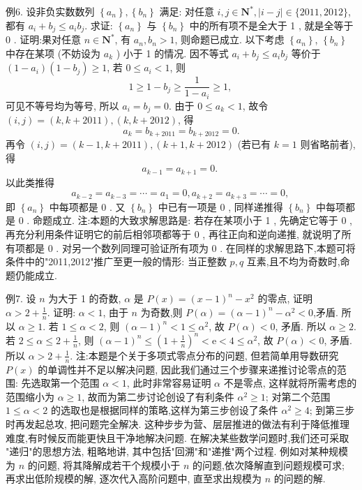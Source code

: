 例6. 设非负实数数列 $\left\{a_n\right\},\left\{b_n\right\}$ 满足: 对任意 $i, j \in \mathbf{N}^*,|i-j| \in \{2011,2012\}$, 都有 $a_i+b_j \leqslant a_i b_j$. 求证: $\left\{a_n\right\}$ 与 $\left\{b_n\right\}$ 中的所有项不是全大于 1 , 就是全等于 0 .
证明:果对任意 $n \in \mathbf{N}^*$, 有 $a_n, b_n>1$, 则命题已成立.
以下考虑 $\left\{a_n\right\}$, $\left\{b_n\right\}$ 中存在某项 (不妨设为 $a_k$ ) 小于 1 的情况.
因不等式 $a_i+b_j \leqslant a_i b_j$ 等价于 $\left(1-a_i\right)\left(1-b_j\right) \geqslant 1$, 若 $0 \leqslant a_i<1$, 则
$$
1 \geqslant 1-b_j \geqslant \frac{1}{1-a_i} \geqslant 1 \text {, }
$$
可见不等号均为等号, 所以 $a_i=b_j=0$.
由于 $0 \leqslant a_k<1$, 故令 $(i, j)=(k, k+2011),(k, k+2012)$, 得
$$
a_k=b_{k+2011}=b_{k+2012}=0 .
$$
再令 $(i, j)=(k-1, k+2011),(k+1, k+2012)$ (若已有 $k=1$ 则省略前者), 得
$$
a_{k-1}=a_{k+1}=0 \text {. }
$$
以此类推得
$$
a_{k-2}=a_{k-3}=\cdots=a_1=0, a_{k+2}=a_{k+3}=\cdots=0 \text {, }
$$
即 $\left\{a_n\right\}$ 中每项都是 0 . 又 $\left\{b_n\right\}$ 中已有一项是 0 , 同样递推得 $\left\{b_n\right\}$ 中每项都是 0 . 命题成立.
注:本题的大致求解思路是: 若存在某项小于 1 , 先确定它等于 0 , 再充分利用条件证明它的前后相邻项都等于 0 , 再往正向和逆向递推, 就说明了所有项都是 0 . 对另一个数列同理可验证所有项为 0 .
在同样的求解思路下,本题可将条件中的"2011,2012"推广至更一般的情形: 当正整数 $p, q$ 互素,且不均为奇数时,命题仍能成立.



例7. 设 $n$ 为大于 1 的奇数, $\alpha$ 是 $P(x)=(x-1)^n-x^2$ 的零点, 证明 $\alpha> 2+\frac{1}{n}$.
证明: $\alpha<1$, 由于 $n$ 为奇数,则 $P(\alpha)=(\alpha-1)^n-\alpha^2<0$,矛盾.
所以 $\alpha \geqslant 1$.
若 $1 \leqslant \alpha<2$, 则 $(\alpha-1)^n<1 \leqslant \alpha^2$, 故 $P(\alpha)<0$, 矛盾.
所以 $\alpha \geqslant 2$.
若 $2 \leqslant \alpha \leqslant 2+\frac{1}{n}$, 则 $(\alpha-1)^n \leqslant\left(1+\frac{1}{n}\right)^n<\mathrm{e}<4 \leqslant \alpha^2$, 故 $P(\alpha)<0$, 矛盾.
所以 $\alpha>2+\frac{1}{n}$.
注:本题是个关于多项式零点分布的问题, 但若简单用导数研究 $P(x)$ 的单调性并不足以解决问题, 因此我们通过三个步骤来递推讨论零点的范围: 先选取第一个范围 $\alpha<1$, 此时非常容易证明 $\alpha$ 不是零点, 这样就将所需考虑的范围缩小为 $\alpha \geqslant 1$, 故而为第二步讨论创设了有利条件 $\alpha^2 \geqslant 1$; 对第二个范围 $1 \leqslant \alpha<2$ 的选取也是根据同样的策略,这样为第三步创设了条件 $\alpha^2 \geqslant 4$; 到第三步时再发起总攻, 把问题完全解决.
这种步步为营、层层推进的做法有利于降低推理难度,有时候反而能更快且干净地解决问题.
在解决某些数学问题时,我们还可采取 "递归"的思想方法, 粗略地讲, 其中包括"回溯"和"递推"两个过程.
例如对某种规模为 $n$ 的问题, 将其降解成若干个规模小于 $n$ 的问题,依次降解直到问题规模可求; 再求出低阶规模的解, 逐次代入高阶问题中, 直至求出规模为 $n$ 的问题的解.



